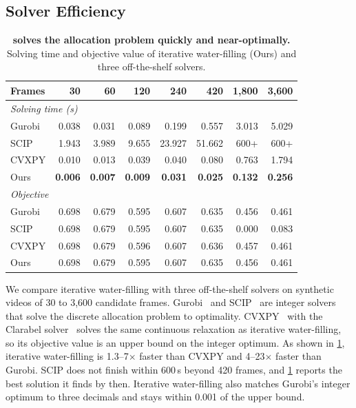 \subsection{Solver Efficiency}
\label{sec:supp-solver}

\begin{table}[t]
  \centering
  \footnotesize
  \setlength{\tabcolsep}{2.6pt}
  \renewcommand{\arraystretch}{1.1}
  \begin{tabular}{l r r r r r r r}
    \toprule
    Frames & 30 & 60 & 120 & 240 & 420 & 1,800 & 3,600 \\
    \midrule
    \multicolumn{8}{l}{\textit{Solving time (s)}} \\
    Gurobi & 0.038 & 0.031 & 0.089 & 0.199 & 0.557 & 3.013 & 5.029 \\
    SCIP   & 1.943 & 3.989 & 9.655 & 23.927 & 51.662 & 600+ & 600+ \\
    CVXPY  & 0.010 & 0.013 & 0.039 & 0.040 & 0.080 & 0.763 & 1.794 \\
    Ours   & \textbf{0.006} & \textbf{0.007} & \textbf{0.009} & \textbf{0.031} & \textbf{0.025} & \textbf{0.132} & \textbf{0.256} \\
    \midrule
    \multicolumn{8}{l}{\textit{Objective}} \\
    Gurobi & 0.698 & 0.679 & 0.595 & 0.607 & 0.635 & 0.456 & 0.461 \\
    SCIP   & 0.698 & 0.679 & 0.595 & 0.607 & 0.635 & 0.000 & 0.083 \\
    CVXPY  & 0.698 & 0.679 & 0.596 & 0.607 & 0.636 & 0.457 & 0.461 \\
    Ours   & 0.698 & 0.679 & 0.595 & 0.607 & 0.635 & 0.456 & 0.461 \\
    \bottomrule
  \end{tabular}
  \caption{\textbf{\name solves the allocation problem quickly and near-optimally.} Solving time and objective value of iterative water-filling (Ours) and three off-the-shelf solvers.}
  \label{tab:supp-solver}
\end{table}


We compare iterative water-filling with three off-the-shelf solvers on synthetic videos of 30 to 3,600 candidate frames. Gurobi~\cite{gurobi} and SCIP~\cite{scip} are integer solvers that solve the discrete allocation problem to optimality. CVXPY~\cite{cvxpy} with the Clarabel solver~\cite{clarabel} solves the same continuous relaxation as iterative water-filling, so its objective value is an upper bound on the integer optimum. As shown in \cref{tab:supp-solver}, iterative water-filling is 1.3--7$\times$ faster than CVXPY and 4--23$\times$ faster than Gurobi. SCIP does not finish within 600\,s beyond 420 frames, and \cref{tab:supp-solver} reports the best solution it finds by then. Iterative water-filling also matches Gurobi's integer optimum to three decimals and stays within 0.001 of the upper bound.

